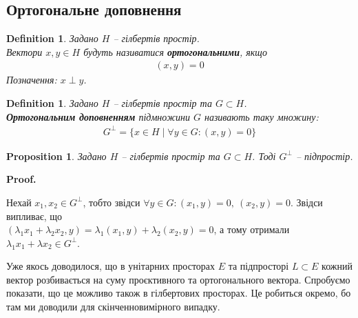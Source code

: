 \documentclass[a4paper, 10pt]{article}
\makeatletter
\theoremstyle{theoremdd}
\theoremstyle{theoremdd}
\newtheorem{definition}[theorem]{Definition}
\theoremstyle{theoremdd}
\theoremstyle{theoremdd}
\theoremstyle{theoremdd}
\newtheorem{proposition}[theorem]{Proposition}
\theoremstyle{theoremdd}
\newtheorem{remark}[theorem]{Remark}
\theoremstyle{theoremdd}
\theoremstyle{theoremdd}
\renewenvironment{proof}[1][Proof.\\]{\par
\pushQED{\hfill \qed}%
\normalfont \topsep6\p@\@plus6\p@\relax
\trivlist
\item\relax
{\bfseries
#1\@addpunct{.}}\hspace\labelsep\ignorespaces
}{%
\popQED\endtrivlist\@endpefalse
}
\DeclareMathOperator{\linspan}{span}
\makeatother
\begin{document}
\subsection{Ортогональне доповнення}
\begin{definition}
Задано $H$ -- гілбертів простір.\\
Вектори $x,y \in H$ будуть називатися \textbf{ортогональними}, якщо
\begin{align*}
(x,y) = 0
\end{align*}
Позначення: $x \perp y$.
\end{definition}

\begin{definition}
Задано $H$ -- гілбертів простір та $G \subset H$.\\
\textbf{Ортогональним доповненням} підмножини $G$ називають таку множину:
\begin{align*}
G^\perp = \{x \in H \mid \forall y \in G: (x,y) = 0\}
\end{align*}
\end{definition}

\begin{proposition}
Задано $H$ -- гілбертів простір та $G \subset H$. Тоді $G^\perp$ -- підпростір.
\end{proposition}

\begin{proof}
Нехай $x_1,x_2 \in G^\perp$, тобто звідси $\forall y \in G: (x_1,y) = 0,\ (x_2,y) = 0$. Звідси випливає, що\\
$(\lambda_1 x_1 + \lambda_2 x_2, y) = \lambda_1 (x_1, y) + \lambda_2 (x_2,y) = 0$, а тому отримали $\lambda_1 x_1 + \lambda x_2 \in G^\perp$.
\end{proof}

\iffalse %
\begin{proposition}
Задано $H$ -- гілбертів простір та $G \subset H$. Тоді $(G^\perp)^\perp = \overline{\linspan(G)}$.
\end{proposition}

\begin{remark}
Якщо $G \subset H$ та підпростір, то $(G^\perp)^\perp = G$. Якщо брати довільну $G \subset H$, то тоді $(G^\perp)^\perp = \overline{\linspan(G)}$.
\end{remark}
\fi
\noindent
Уже якось доводилося, що в унітарних просторах $E$ та підпросторі $L \subset E$ кожний вектор розбивається на суму проєктивного та ортогонального вектора. Спробуємо показати, що це можливо також в гілбертових просторах. Це робиться окремо, бо там ми доводили для скінченновимірного випадку.
\end{document}
